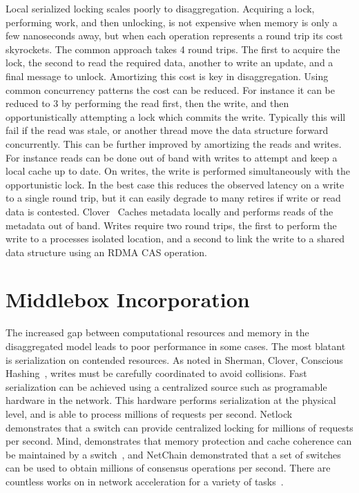 Local serialized locking scales poorly to disaggregation. Acquiring a lock,
performing work, and then unlocking, is not expensive when memory is only a few
nanoseconds away, but when each operation represents a round trip its cost
skyrockets. The common approach takes 4 round trips. The first to acquire the
lock, the second to read the required data, another to write an update, and a
final message to unlock. Amortizing this cost is key in disaggregation. Using
common concurrency patterns the cost can be reduced. For instance it can be
reduced to 3 by performing the read first, then the write, and then
opportunistically attempting a lock which commits the write. Typically this will
fail if the read was stale, or another thread move the data structure forward
concurrently. This can be further improved by amortizing the reads and writes.
For instance reads can be done out of band with writes to attempt and keep a
local cache up to date. On writes, the write is performed simultaneously with
the opportunistic lock. In the best case this reduces the observed latency on a
write to a single round trip, but it can easily degrade to many retires if write
or read data is contested. Clover~\cite{clover} Caches metadata locally and
performs reads of the metadata out of band. Writes require two round trips, the
first to perform the write to a processes isolated location, and a second to
link the write to a shared data structure using an RDMA CAS operation.



\section{Middlebox Incorporation}

The increased gap between computational resources and memory in the
disaggregated model leads to poor performance in some cases. The most blatant is
serialization on contended resources. As noted in Sherman, Clover, Conscious
Hashing~\cite{sherman,clover,one-sided-hash}, writes must be carefully
coordinated to avoid collisions. Fast serialization can be achieved using a
centralized source such as programable hardware in the network. This hardware
performs serialization at the physical level, and is able to process millions of
requests per second. Netlock~\cite{netlock} demonstrates that a switch can
provide centralized locking for millions of requests per second. Mind,
demonstrates that memory protection and cache coherence can be maintained by a
switch~\cite{mind}, and NetChain demonstrated that a set of switches can be used
to obtain millions of consensus operations per second. There are countless works
on in network acceleration for a variety of tasks~.

